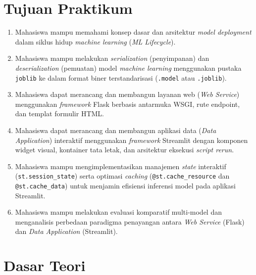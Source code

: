 \documentclass[a4paper,oneside,11pt]{book}
\begin{document}
\section{Tujuan Praktikum}
\begin{enumerate}[label=\Alph*.]
  \item Mahasiswa mampu memahami konsep dasar dan arsitektur \textit{model deployment} dalam siklus hidup \textit{machine learning} (\textit{ML Lifecycle}).
  \item Mahasiswa mampu melakukan \textit{serialization} (penyimpanan) dan \textit{deserialization} (pemuatan) model \textit{machine learning} menggunakan pustaka \texttt{joblib} ke dalam format biner terstandarisasi (\texttt{.model} atau \texttt{.joblib}).
  \item Mahasiswa dapat merancang dan membangun layanan web (\textit{Web Service}) menggunakan \textit{framework} Flask berbasis antarmuka WSGI, rute endpoint, dan templat formulir HTML.
  \item Mahasiswa dapat merancang dan membangun aplikasi data (\textit{Data Application}) interaktif menggunakan \textit{framework} Streamlit dengan komponen widget visual, kontainer tata letak, dan arsitektur eksekusi \textit{script rerun}.
  \item Mahasiswa mampu mengimplementasikan manajemen \textit{state} interaktif (\texttt{st.session\_state}) serta optimasi \textit{caching} (\texttt{@st.cache\_resource} dan \texttt{@st.cache\_data}) untuk menjamin efisiensi inferensi model pada aplikasi Streamlit.
  \item Mahasiswa mampu melakukan evaluasi komparatif multi-model dan menganalisis perbedaan paradigma penayangan antara \textit{Web Service} (Flask) dan \textit{Data Application} (Streamlit).
\end{enumerate}

\section{Dasar Teori}
\end{document}
